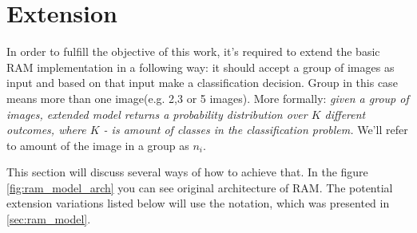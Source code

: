 {%















%
%
%


\section{Extension}

In order to fulfill the objective of this work, it's required to extend the basic
RAM implementation in a following way: it should accept a group of images as input
and based on that input make a classification decision. Group in this case means
more than one image(e.g. 2,3 or 5 images). More formally:
\textit{given a group of images, extended model returns a probability distribution over
$K$ different outcomes, where $K$ - is amount of classes in the classification problem.}
We'll refer to amount of the image in a group as $n_i$.

This section will discuss several ways of how to achieve that.
In the figure \ref{fig:ram_model_arch} you can see original architecture of RAM.
The potential extension variations listed below will use the notation, which
was presented in \autoref{sec:ram_model}.

}
